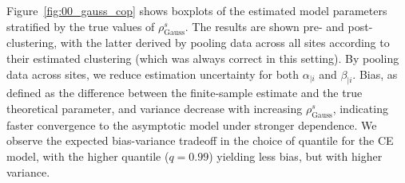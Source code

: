 \documentclass[12pt,compact]{article}
\newcommand{\rhou}[1]{\rho_{\text{#1}}}
\begin{document}

Figure~\ref{fig:00_gauss_cop} shows boxplots of the estimated model parameters stratified by the true values of $\rho_{\text{Gauss}}^s$.
The results are shown pre- and post-clustering, with the latter derived by pooling data across all sites according to their estimated clustering (which was always correct in this setting).
By pooling data across sites, we reduce estimation uncertainty for both $\alpha_{\mid i}$ and $\beta_{\mid i}$.
Bias, as defined as the difference between the finite-sample estimate and the true theoretical parameter, and variance decrease with increasing $\rho_{\text{Gauss}}^s$, indicating faster convergence to the asymptotic model under stronger dependence. 
We observe the expected bias-variance tradeoff in the choice of quantile for the CE model, with the higher quantile ($q=0.99$) yielding less bias, but with higher variance.
\end{document}
